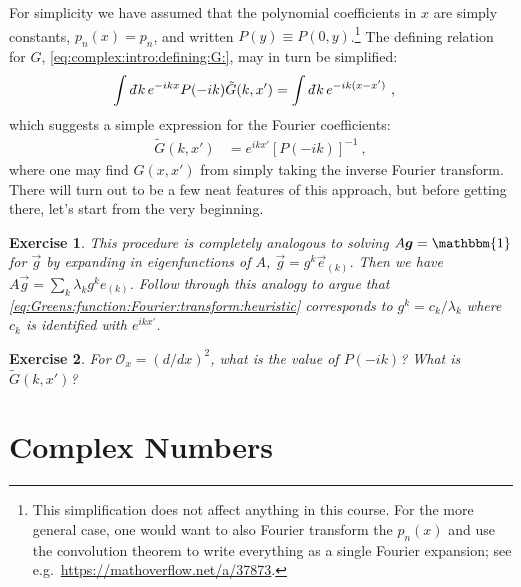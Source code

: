 \documentclass[
  11pt,
	colorful,
	raggedright,
]{tufte-style-thesis-flip}
\newtheorem{exercise}{Exercise}[section]
\renewcommand{\dbar}{d\mkern-6mu\mathchar'26\hspace{-.1em}}    %
\begin{document}
For simplicity we have assumed that the polynomial coefficients in $x$ are simply constants, $p_n(x) = p_n$, and written $P(y) \equiv P(0,y)$.\footnote{This simplification does not affect anything in this course. For the more general case, one would want to also Fourier transform the $p_n(x)$ and use the convolution theorem to write everything as a single Fourier expansion; see e.g.~\url{https://mathoverflow.net/a/37873}.}
The defining relation for $G$,
\eqref{eq:complex:intro:defining:G:}, may in turn be simplified:
\begin{align}
  \int \dbar k \, e^{-ikx} P(-ik) \tilde G(k,x') &= \int \dbar k \, e^{-ik(x-x')} \ ,
\end{align}
which suggests a simple expression for the Fourier coefficients:
\begin{align}
  \tilde G(k,x') &= e^{ikx'} \left[P(-ik)\right]^{-1} \ ,
  \label{eq:Greens:function:Fourier:transform:heuristic}
\end{align}
where one may find $G(x,x')$ from simply taking the inverse Fourier transform. There will turn out to be a few neat features of this approach, but before getting there, let's start from the very beginning.

\begin{exercise}
This procedure is completely analogous to solving $A \vec{g} = \mathbbm{1}$ for $\vec{g}$ by expanding in eigenfunctions of $A$, $\vec g = g^k \vec{e}_{(k)}$. Then we have $A\vec{g} = \sum_k \lambda_k g^k e_{(k)}$. Follow through this analogy to argue that \eqref{eq:Greens:function:Fourier:transform:heuristic} corresponds to $g^k = c_k/\lambda_k$ where $c_k$ is identified with $e^{ikx'}$.
\end{exercise}

\begin{exercise}
For $\mathcal O_x = (d/dx)^2$, what is the value of $P(-ik)$? What is $\tilde G(k,x')$?
\end{exercise}

\section{Complex Numbers}
\end{document}
